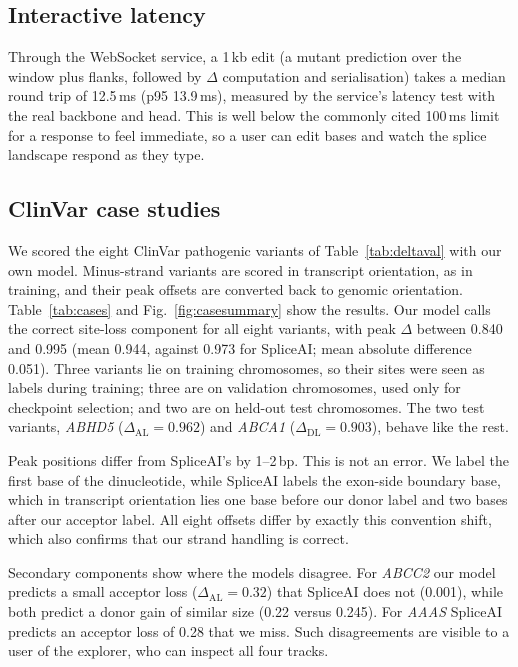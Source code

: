 \documentclass[conference]{IEEEtran}
\begin{document}
\subsection{Interactive latency}
Through the WebSocket service, a 1\,kb edit (a mutant prediction over the window plus flanks, followed by $\Delta$ computation and serialisation) takes a median round trip of 12.5\,ms (p95 13.9\,ms), measured by the service's latency test with the real backbone and head. This is well below the commonly cited 100\,ms limit for a response to feel immediate, so a user can edit bases and watch the splice landscape respond as they type.

\subsection{ClinVar case studies}
We scored the eight ClinVar pathogenic variants of Table~\ref{tab:deltaval} with our own model. Minus-strand variants are scored in transcript orientation, as in training, and their peak offsets are converted back to genomic orientation. Table~\ref{tab:cases} and Fig.~\ref{fig:casesummary} show the results. Our model calls the correct site-loss component for all eight variants, with peak $\Delta$ between 0.840 and 0.995 (mean 0.944, against 0.973 for SpliceAI; mean absolute difference 0.051). Three variants lie on training chromosomes, so their sites were seen as labels during training; three are on validation chromosomes, used only for checkpoint selection; and two are on held-out test chromosomes. The two test variants, \textit{ABHD5} ($\Delta_{\mathrm{AL}}=0.962$) and \textit{ABCA1} ($\Delta_{\mathrm{DL}}=0.903$), behave like the rest.

Peak positions differ from SpliceAI's by 1--2\,bp. This is not an error. We label the first base of the dinucleotide, while SpliceAI labels the exon-side boundary base, which in transcript orientation lies one base before our donor label and two bases after our acceptor label. All eight offsets differ by exactly this convention shift, which also confirms that our strand handling is correct.

Secondary components show where the models disagree. For \textit{ABCC2} our model predicts a small acceptor loss ($\Delta_{\mathrm{AL}}=0.32$) that SpliceAI does not (0.001), while both predict a donor gain of similar size (0.22 versus 0.245). For \textit{AAAS} SpliceAI predicts an acceptor loss of 0.28 that we miss. Such disagreements are visible to a user of the explorer, who can inspect all four tracks.
\end{document}
